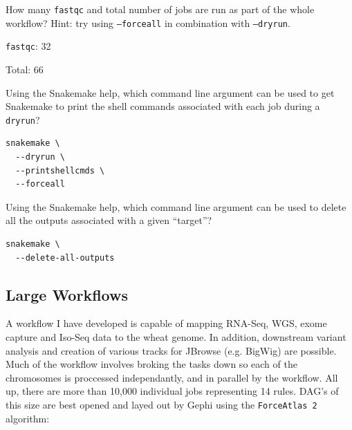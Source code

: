 \begin{questions}

How many \texttt{fastqc} and total number of jobs are run as part of the whole workflow? Hint: try using \texttt{--forceall} in combination
with \texttt{--dryrun}.

\begin{answer}

\texttt{fastqc}: 32

Total: 66

\end{answer}

Using the Snakemake help, which command line argument can be used to get Snakemake to print the shell commands associated with each job during a \texttt{dryrun}?

\begin{answer}

\begin{lstlisting}
snakemake \
  --dryrun \
  --printshellcmds \
  --forceall
\end{lstlisting}

\end{answer}

Using the Snakemake help, which command line argument can be used to delete all the outputs associated with a given ``target''?

\begin{answer}

\begin{lstlisting}
snakemake \
  --delete-all-outputs
\end{lstlisting}

\end{answer}

\end{questions}

\subsection{Large Workflows}

A workflow I have developed is capable of mapping RNA-Seq, WGS, exome capture and Iso-Seq data to the wheat genome. In addition, downstream variant analysis and creation
of various tracks for JBrowse (e.g. BigWig) are possible. Much of the workflow involves broking the tasks down so each of the chromosomes is proccessed independantly, and
in parallel by the workflow. All up, there are more than 10,000 individual jobs representing 14 rules. DAG's of this size are best opened and layed out by Gephi using the
\texttt{ForceAtlas 2} algorithm:

